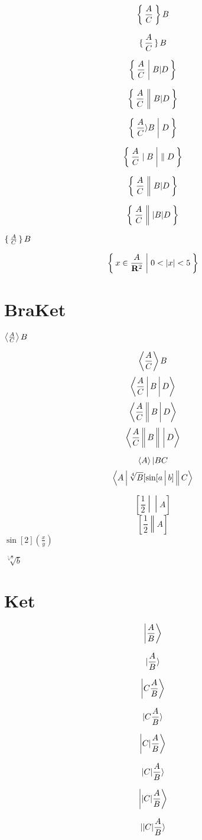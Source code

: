 \documentclass{article}
\begin{document}
\[\Set{\frac{A}{C}}{B}\]

\[\set{\frac{A}{C}}{B}\]

\[\Set{\frac{A}{C} | B | D}\]

\[\Set{\frac{A}{C} \| B | D}\]

\[\Set{\frac{A}{C} \rangle B | D}\]

\[\Set{\frac{A}{C} \mid B | \parallel D}\]

\[\Set{\frac{A}{C} || B | D}\]

\[\Set{\frac{A}{C} ||| B | D}\]

$\set{\frac{A}{C}}{B}$

\[\Set{ x\in\frac{A}{\mathbf{R}^2} | 0<{|x|}<5 }\]



\newpage
\section*{BraKet}
$\Braket{\frac{A}{C}}{B}$

\[\Braket{\frac{A}{C}}{B}\]
\[\Braket{\frac{A}{C} | B | D}\]
\[\Braket{\frac{A}{C} || B | D}\]
\[\Braket{\frac{A}{C} || B ||| D}\]

\[\Braket A|B C\]
\[\Braket{A|\sqrt[4]{B}[\sin[a|b] ||C}\]

\[\left[ \frac{1}{2}\middle|\middle| A\right ]\]
\[\left[ \frac{1}{2}\middle\| A\right ]\]
$\sin[2](\frac{x}{y})$

$\sqrt[{\sqrt[5]{a}}]{b}$
\newpage
\section*{Ket}
\[\Ket{\frac{A}{B}}\]

\[\ket{\frac{A}{B}}\]

\[\Ket{C\frac{A}{B}}\]

\[\ket{C\frac{A}{B}}\]

\[\Ket{C|\frac{A}{B}}\]

\[\ket{C|\frac{A}{B}}\]

\[\Ket{|C|\frac{A}{B}}\]

\[\ket{|C|\frac{A}{B}}\]
\end{document}
